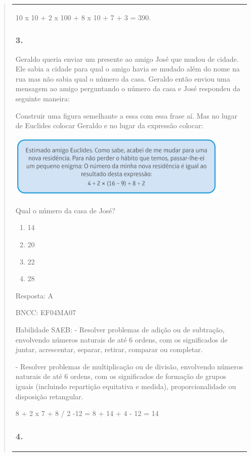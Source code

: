 \begin{enumerate}
\begin{escolha}
\begin{enumerate}
\begin{itemize}
\begin{itemize}
\begin{escolha}
\begin{quote}
\begin{escolha}
{\begin{longtable}[]{@{}l@{}}
\begin{itemize}
10 x 10 + 2 x 100 + 8 x 10 + 7 + 3 = 390.

\subsubsection{3. }\label{section-189}

Geraldo queria enviar um presente ao amigo José que mudou de cidade. Ele
sabia a cidade para qual o amigo havia se mudado além do nome na rua mas
não sabia qual o número da casa. Geraldo então enviou uma mensagem ao
amigo perguntando o número da casa e José respondeu da seguinte maneira:

Construir uma figura semelhante a essa com essa frase aí. Mas no lugar
de Euclides colocar Geraldo e no lugar da expressão colocar:

\includegraphics[width=4.19231in,height=1.20373in]{media/image165.png}

Qual o número da casa de José?

\begin{enumerate}
\def\labelenumi{\alph{enumi})}
\item
  14
\item
  20
\item
  22
\item
  28
\end{enumerate}

Resposta: A

BNCC: EF04MA07

Habilidade SAEB: - Resolver problemas de adição ou de subtração,
envolvendo números naturais de até 6 ordens, com os significados de
juntar, acrescentar, separar, retirar, comparar ou completar.

- Resolver problemas de multiplicação ou de divisão, envolvendo números
naturais de até 6 ordens, com os significados de formação de grupos
iguais (incluindo repartição equitativa e medida), proporcionalidade ou
disposição retangular.

8 + 2 x 7 + 8 / 2 -12 = 8 + 14 + 4 - 12 = 14

\subsubsection{4. }\label{section-190}


\end{itemize}
\end{longtable}}
\end{escolha}
\end{quote}
\end{escolha}
\end{itemize}
\end{itemize}
\end{enumerate}
\end{escolha}
\end{enumerate}
